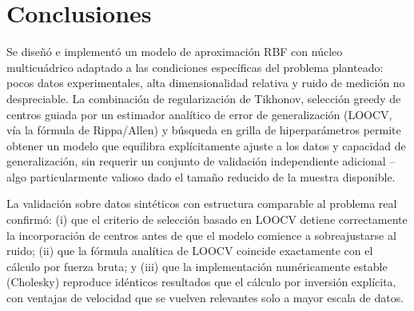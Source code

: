 \documentclass[11pt,a4paper]{article}
\begin{document}
\section{Conclusiones}

Se dise\~n\'o e implement\'o un modelo de aproximaci\'on RBF con n\'ucleo
multicu\'adrico adaptado a las condiciones espec\'ificas del problema
planteado: pocos datos experimentales, alta dimensionalidad relativa y ruido
de medici\'on no despreciable. La combinaci\'on de regularizaci\'on de
Tikhonov, selecci\'on greedy de centros guiada por un estimador anal\'itico de
error de generalizaci\'on (LOOCV, v\'ia la f\'ormula de Rippa/Allen) y
b\'usqueda en grilla de hiperpar\'ametros permite obtener un modelo que
equilibra expl\'icitamente ajuste a los datos y capacidad de generalizaci\'on,
sin requerir un conjunto de validaci\'on independiente adicional --algo
particularmente valioso dado el tama\~no reducido de la muestra disponible.

La validaci\'on sobre datos sint\'eticos con estructura comparable al problema
real confirm\'o: (i) que el criterio de selecci\'on basado en LOOCV detiene
correctamente la incorporaci\'on de centros antes de que el modelo comience a
sobreajustarse al ruido; (ii) que la f\'ormula anal\'itica de LOOCV coincide
exactamente con el c\'alculo por fuerza bruta; y (iii) que la implementaci\'on
num\'ericamente estable (Cholesky) reproduce id\'enticos resultados que el
c\'alculo por inversi\'on expl\'icita, con ventajas de velocidad que se
vuelven relevantes solo a mayor escala de datos.
\end{document}

